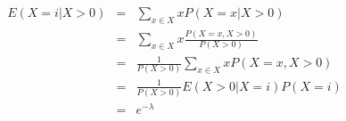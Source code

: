 \documentclass[10pt]{article}
\begin{document}
\begin{easylist}[enumerate]
    \[
        \begin{aligned}
            E(X=i|X>0) &=& \sum_{x \in X} xP(X=x|X>0)\\
            &=& \sum_{x \in X} x\frac{P(X=x,X>0)}{P(X>0)}\\
            &=& \frac{1}{P(X>0)} \sum_{x \in X} xP(X=x,X>0)\\
            &=& \frac{1}{P(X>0)} E(X>0|X=i) P(X=i)\\
            &=& e^{-\lambda}
        \end{aligned}
    \]
\end{easylist}
\end{document}
